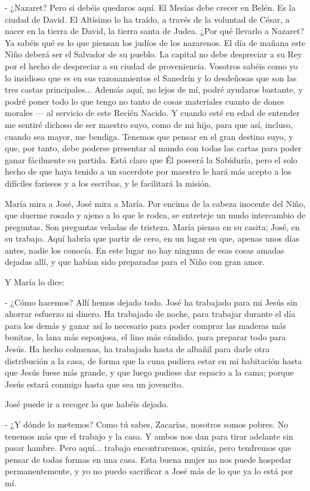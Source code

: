 \documentclass[12pt, twoside, openright]{book} %
\begin{document}
- ¿Nazaret? Pero si debéis quedaros aquí. El Mesías debe crecer en Belén. Es la ciudad de David. El Altísimo lo ha traído, a través de la voluntad de César, a nacer en la tierra de David, la tierra santa de Judea. ¿Por qué llevarlo a Nazaret? Ya sabéis qué es lo que piensan los judíos de los nazarenos. El día de mañana este Niño deberá ser el Salvador de su pueblo. La capital no debe despreciar a su Rey por el hecho de despreciar a su ciudad de proveniencia. Vosotros sabéis como yo lo insidioso que es en sus razonamientos el Sanedrín y lo desdeñosas que son las tres castas principales... Además aquí, no lejos de mí, podré ayudaros bastante, y podré poner todo lo que tengo no tanto de cosas materiales cuanto de dones morales — al servicio de este Recién Nacido. Y cuando esté en edad de entender me sentiré dichoso de ser maestro suyo, como de mi hijo, para que así, incluso, cuando sea mayor, me bendiga. Tenemos que pensar en el gran destino suyo, y que, por tanto, debe poderse presentar al mundo con todas las cartas para poder ganar fácilmente su partida. Está claro que Él poseerá la Sabiduría, pero el solo hecho de que haya tenido a un sacerdote por maestro le hará más acepto a los difíciles fariseos y a los escribas, y le facilitará la misión. 

María mira a José, José mira a María. Por encima de la cabeza inocente del Niño, que duerme rosado y ajeno a lo que le rodea, se entreteje un mudo intercambio de preguntas. Son preguntas veladas de tristeza. María piensa en su casita; José, en su trabajo. Aquí habría que partir de cero, en un lugar en que, apenas unos días antes, nadie los conocía. En este lugar no hay ninguna de esas cosas amadas dejadas allí, y que habían sido preparadas para el Niño con gran amor. 

Y María lo dice: 

- ¿Cómo hacemos? Allí hemos dejado todo. José ha trabajado para mi Jesús sin ahorrar esfuerzo ni dinero. Ha trabajado de noche, para trabajar durante el día para los demás y ganar así lo necesario para poder comprar las maderas más bonitas, la lana más esponjosa, el lino más cándido, para preparar todo para Jesús. Ha hecho colmenas, ha trabajado hasta de albañil para darle otra distribución a la casa, de forma que la cuna pudiera estar en mi habitación hasta que Jesús fuese más grande, y que luego pudiese dar espacio a la cama; porque Jesús estará conmigo hasta que sea un jovencito. 

José puede ir a recoger lo que habéis dejado. 

- ¿Y dónde lo metemos? Como tú sabes, Zacarías, nosotros somos pobres. No tenemos más que el trabajo y la casa. Y ambos nos dan para tirar adelante sin pasar hambre. Pero aquí... trabajo encontraremos, quizás, pero tendremos que pensar de todas formas en una casa. Esta buena mujer no nos puede hospedar permanentemente, y yo no puedo sacrificar a José más de lo que ya lo está por mí. 
\end{document}
